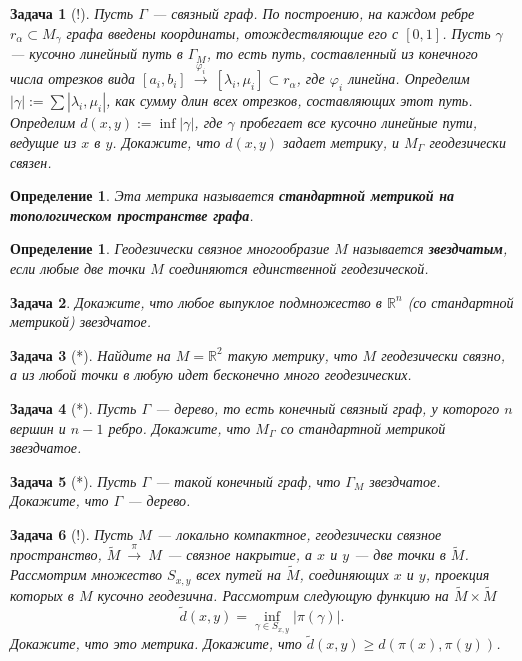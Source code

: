 \documentclass[12pt]{book}
\newcommand{\arrow}{{\:\longrightarrow\:}}
\renewcommand{\phi}{\varphi}
\def\R{{\mathbb R}}
\theoremstyle{upshape}
\newtheorem{zadacha}{Задача}[chapter]
\theoremstyle{generic}
\newtheorem{opredelenie}[teorema]{Определение}
\theoremstyle{upshapenonumber}
\newcommand{\следствие}{%
     \refstepcounter{teorema}
     {\noindent\bf Следствие \thechapter.\arabic{teorema}:\ }}
\newcommand{\пример}{%
     \refstepcounter{teorema}
     {\noindent\bf Пример \thechapter.\arabic{teorema}:\ }}
\newcommand{\лемма}{%
     \refstepcounter{teorema}
     {\noindent\bf Лемма \thechapter.\arabic{teorema}:\ }}
\newcommand{\теорема}{%
     \refstepcounter{teorema}
     {\noindent\bf Теорема \thechapter.\arabic{teorema}:\ }}
\newcommand{\утверждение}{%
     \refstepcounter{teorema}
     {\noindent\bf Утверждение \thechapter.\arabic{teorema}:\ }}
\begin{document}
{\begin{zadacha}[!]
Пусть $\Gamma$ --- связный граф. 
По построению, на каждом ребре
$r_\alpha\subset M_\gamma$ графа введены 
координаты, отождествляющие его с $[0,1]$.
Пусть $\gamma$ --- кусочно линейный путь в $\Gamma_M$,
то есть путь, составленный из конечного числа отрезков вида 
$[a_i,b_{i}]\stackrel{\phi_i}\arrow [\lambda_i, \mu_i]\subset r_\alpha$, 
где $\phi_i$ линейна. Определим $|\gamma|:= \sum|\lambda_i,\mu_i|$, 
как сумму длин всех отрезков, составляющих этот путь. 
Определим $d(x,y):= \inf |\gamma|$, где $\gamma$ пробегает
все кусочно линейные пути, ведущие из $x$ в $y$. 
Докажите, что $d(x,y)$ задает метрику, и $M_\Gamma$
геодезически связен.
\end{zadacha}

\begin{opredelenie}
Эта метрика называется
{\bf стандартной метрикой на 
топологическом пространстве графа}.
\end{opredelenie}

\begin{opredelenie}
Геодезически связное многообразие $M$ называется
{\bf звездчатым}, если любые две точки $M$ соединяются
единственной геодезической.
\end{opredelenie}

\begin{zadacha} 
Докажите, что любое выпуклое подмножество в $\R^n$
(со стандартной метрикой) звездчатое.
\end{zadacha}

\begin{zadacha}[*]
Найдите на $M=\R^2$ такую метрику, что $M$ геодезически
связно, а из любой точки в любую идет бесконечно
много геодезических.
\end{zadacha}

\begin{zadacha}[*]
Пусть $\Gamma$ --- дерево, то есть 
конечный связный граф, у которого
$n$ вершин и $n-1$ ребро. Докажите, что 
$M_\Gamma$ со стандартной метрикой
звездчатое.
\end{zadacha}

\begin{zadacha}[*]
Пусть $\Gamma$ --- такой конечный граф, что $\Gamma_M$
звездчатое. Докажите, что $\Gamma$ --- дерево.
\end{zadacha}

\begin{zadacha}[!]
Пусть $M$ --- локально компактное,
геодезически связное пространство, 
$\tilde M\stackrel\pi\arrow M$ --- связное 
накрытие, а $x$ и $y$ --- две точки в $\tilde M$. 
Рассмотрим множество $S_{x,y}$ всех путей на $\tilde M$,
соединяющих $x$ и $y$, проекция которых в $M$ кусочно геодезична.
Рассмотрим следующую функцию на $\tilde M \times \tilde M$
\[ \tilde d(x,y) = \inf_{\gamma\in S_{x,y}}|\pi(\gamma)|.\]
Докажите, что это метрика. Докажите, что 
$\tilde d(x,y)\geq d(\pi(x),\pi(y))$. 
\end{zadacha}

}
\end{document}
